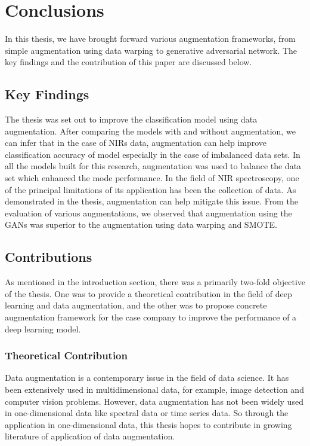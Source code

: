 \chapter{Conclusions}
\label{chapter:conclusions}

In this thesis, we have brought forward various augmentation frameworks, from simple augmentation using data warping to generative adversarial network. The key findings and the contribution of this paper are discussed below.


\section{Key Findings}

The thesis was set out to improve the classification model using data augmentation. After comparing the models with and without augmentation, we can infer that in the case of NIRs data, augmentation can help improve classification accuracy of model especially in the case of imbalanced data sets. In all the models built for this research, augmentation was used to balance the data set which enhanced the mode performance. In the field of NIR spectroscopy, one of the principal limitations of its application has been the collection of data. As demonstrated in the thesis, augmentation can help mitigate this issue. From the evaluation of various augmentations, we observed that augmentation using the GANs was superior to the augmentation using data warping and SMOTE. 
   
  
\section{Contributions}

As mentioned in the introduction section, there was a primarily two-fold objective of the thesis. One was to provide a theoretical contribution in the field of deep learning and data augmentation, and the other was to propose concrete augmentation framework for the case company to improve the performance of a deep learning model. 

\subsection{Theoretical Contribution}
Data augmentation is a contemporary issue in the field of data science. It has been extensively used in multidimensional data, for example, image detection and computer vision problems. However, data augmentation has not been widely used in one-dimensional data like spectral data or time series data. So through the application in one-dimensional data, this thesis hopes to contribute in growing literature of application of data augmentation.


